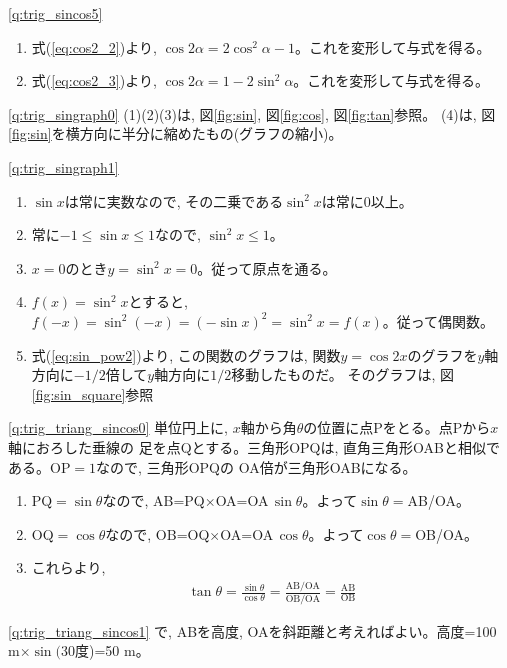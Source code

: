 \ref{q:trig_sincos5} 
\begin{enumerate}
\item 式(\ref{eq:cos2_2})より, $\cos 2\alpha = 2\cos^2 \alpha - 1$。これを変形して与式を得る。
\item 式(\ref{eq:cos2_3})より, $\cos 2\alpha = 1 - 2\sin^2 \alpha$。これを変形して与式を得る。
\end{enumerate}
\mv



\ref{q:trig_singraph0} 
(1)(2)(3)は, 図\ref{fig:sin}, 図\ref{fig:cos}, 図\ref{fig:tan}参照。
(4)は, 図\ref{fig:sin}を横方向に半分に縮めたもの(グラフの縮小)。
\mv

\ref{q:trig_singraph1}  
\begin{enumerate}
\item $\sin x$は常に実数なので, その二乗である$\sin^2 x$は常に0以上。
\item 常に$-1 \le \sin x \le 1$なので, $\sin^2 x \le 1$。
\item $x=0$のとき$y=\sin^2 x=0$。従って原点を通る。
\item $f(x)=\sin^2x$とすると, $f(-x)=\sin^2(-x)=(-\sin x)^2=\sin^2x=f(x)$。従って偶関数。
\item 式(\ref{eq:sin_pow2})より, この関数のグラフは, 関数$y=\cos 2x$のグラフを$y$軸方向に$-1/2$倍して$y$軸方向に$1/2$移動したものだ。
そのグラフは, 図\ref{fig:sin_square}参照
\end{enumerate}

\mv
{}\ref{q:trig_triang_sincos0}  単位円上に, $x$軸から角$\theta$の位置に点Pをとる。点Pから$x$軸におろした垂線の
足を点Qとする。三角形OPQは, 直角三角形OABと相似である。OP$=1$なので, 三角形OPQの
OA倍が三角形OABになる。
\begin{enumerate}
\item PQ$=\sin \theta$なので, AB=PQ$\times$OA=OA$\,\sin \theta$。よって$\sin\theta=$AB/OA。
\item OQ$=\cos\theta$なので, OB=OQ$\times$OA=OA$\,\cos \theta$。よって$\cos\theta=$OB/OA。
\item これらより, 
\begin{eqnarray*}\tan\theta=\frac{\sin\theta}{\cos\theta}=\frac{\text{AB/OA}}{\text{OB/OA}}=\frac{\text{AB}}{\text{OB}}\end{eqnarray*}
\end{enumerate}
\mv

\ref{q:trig_triang_sincos1} で, 
ABを高度, OAを斜距離と考えればよい。高度=100$\,\,$m$\times \sin($30度)=50$\,\,$m。
\mv

